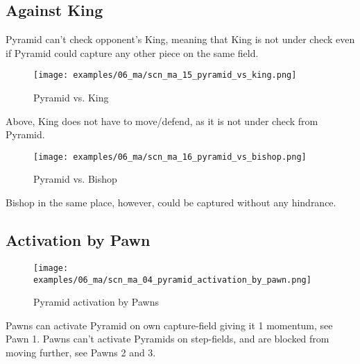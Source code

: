 \clearpage %

\subsection*{Against King}

Pyramid can't check opponent's King, meaning that King is not under check even if
Pyramid could capture any other piece on the same field.

\noindent
\begin{figure}[!h]
\texttt{[image: examples/06\_ma/scn\_ma\_15\_pyramid\_vs\_king.png]}
\caption{Pyramid vs. King}
\label{fig:scn_ma_15_pyramid_vs_king}
\end{figure}

Above, King does not have to move/defend, as it is not under check from Pyramid.

\noindent
\begin{figure}[!h]
\texttt{[image: examples/06\_ma/scn\_ma\_16\_pyramid\_vs\_bishop.png]}
\caption{Pyramid vs. Bishop}
\label{fig:scn_ma_16_pyramid_vs_bishop}
\end{figure}

Bishop in the same place, however, could be captured without any hindrance.

\clearpage %

\subsection*{Activation by Pawn}

\noindent
\begin{figure}[!h]
\texttt{[image: examples/06\_ma/scn\_ma\_04\_pyramid\_activation\_by\_pawn.png]}
\caption{Pyramid activation by Pawns}
\label{fig:scn_ma_04_pyramid_activation_by_pawn}
\end{figure}

Pawns can activate Pyramid on own capture-field giving it 1 momentum, see Pawn 1.
Pawns can't activate Pyramids on step-fields, and are blocked from moving further,
see Pawns 2 and 3.

